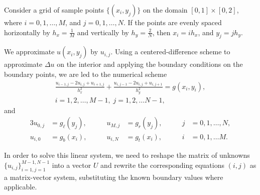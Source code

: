 \documentclass{homework}
\begin{document}
	\begin{alphaparts}
		\questionpart Consider a grid of sample points $\{(x_i, y_j)\}$ on the domain $[0,1]\times[0,2]$, where $i = 0,1,\dots, M$, and $j = 0,1,\dots, N$. If the points are evenly spaced horizontally by $h_x = \frac{1}{M}$ and vertically by $h_y = \frac{2}{N}$, then $x_i = ih_x$, and $y_j = jh_y$.
		
		We approximate $u(x_i,y_j)$ by $u_{i,j}$. Using a centered-difference scheme to approximate $\Delta u$ on the interior and applying the boundary conditions on the boundary points, we are led to the numerical scheme
		\begin{equation*}
			\tag{$i,j$}
			\begin{split}
				\frac{u_{i-1,j} - 2u_{i,j} + u_{i+1,j}}{h_x^2} + \frac{u_{i,j-1} -2 u_{i,j} + u_{i,j+1}}{h_y^2} = g(x_i, y_i),\\  i=1,2,\dots, M-1,\; j=1,2,\dots N-1,
			\end{split}
		\end{equation*}
		and
		\begin{alignat*}{3}
			u_{0,j} &= g_\ell(y_j),& \qquad u_{M,j} &= g_r(y_j),& \qquad j&=0,1,\dots,N,\\
			u_{i,0} &= g_b(x_i), & \qquad u_{i,N} &= g_t(x_i),& \qquad i&=0,1,\dots M.
		\end{alignat*}
		
		
		
		In order to solve this linear system, we need to reshape the matrix of unknowns $\{u_{i,j}\}_{i=1,j=1}^{M-1,N-1}$ into a vector $U$ and rewrite the corresponding equations $(i,j)$ as a matrix-vector system, substituting the known boundary values where applicable.
		

\end{alphaparts}
\end{document}
